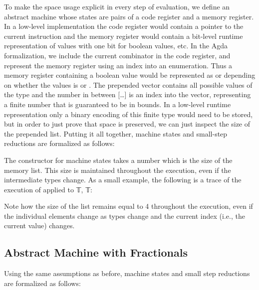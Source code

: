 \documentclass[sigplan,10pt,review,anonymous]{acmart}
\begin{document}
\PIMEMcardeq{}

To make the space usage explicit in every step of evaluation, we
define an abstract machine whose states are pairs of a code register
and a memory register. In a low-level implementation the code register
would contain a pointer to the current instruction and the memory
register would contain a bit-level runtime representation of values
with one bit for boolean values, etc. In the Agda formalization, we
include the current combinator in the code register, and represent the
memory register using an index into an enumeration. Thus a memory
register containing a boolean value would be represented as
\AgdaFunction{[𝔽 ,  𝕋 ][0]} or \AgdaFunction{[𝔽 ,  𝕋 ][1]} depending on whether the
values is  or .
The prepended vector
contains all possible values of the type and the number in between [\ldots ]
is an index into the vector, representing a finite number that
is guaranteed to be in bounds. In a low-level runtime representation
only a binary encoding of this finite type would need to be stored, but in
order to just prove that space is preserved, we can just inspect the
size of the prepended list. Putting it all together, machine states and
small-step reductions are formalized as follows:

\PIMEMstep{}

The constructor for machine states takes a number which is the size of
the memory list. This size is maintained throughout the execution,
even if the intermediate types change. As a small example, the
following is a trace of the execution of  applied
to 𝕋, 𝕋:
{\center}

Note how the size of the list remains equal to 4 throughout the
execution, even if the individual elements change as types change and
the current index (i.e., the current value) changes.


\subsection{Abstract Machine with Fractionals}

Using the same assumptions as before, machine states and small step
reductions are formalized as follows:
\end{document}
